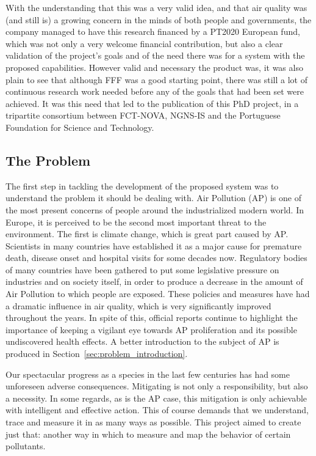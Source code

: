 With the understanding that this was a very valid idea, and that air
quality was (and still is) a growing concern in the minds of both people
and governments, the company managed to have this research financed by
a PT2020 European fund, which was not only a very welcome financial
contribution, but also a clear validation of the project's goals and of
the need there was for a system with the proposed capabilities. However
valid and necessary the product was, it was also plain to see that
although \gls{FFF} was a good starting point, there was still a lot of
continuous research work needed before any of the goals that had been
set were achieved. It was this need that led to the publication of this
PhD project, in a tripartite consortium between FCT-NOVA, NGNS-IS and
the Portuguese Foundation for Science and Technology.

\subsection{The Problem}%
\label{sub:the_problem}

The first step in tackling the development of the proposed system was to
understand the problem it should be dealing with. Air Pollution
(\gls{AP}) is one of the most present concerns of people around the
industrialized modern world. In Europe, it is perceived to be the second
most important threat to the environment. The first is climate change,
which is great part caused by \gls{AP}. Scientists in many countries
have established it as a major cause for premature death, disease onset
and hospital visits for some decades now. Regulatory bodies of many
countries have been gathered to put some legislative pressure on
industries and on society itself, in order to produce a decrease in the
amount of Air Pollution to which people are exposed. These policies and
measures have had a dramatic influence in air quality, which is very
significantly improved throughout the years. In spite of this, official
reports continue to highlight the importance of keeping a vigilant eye
towards \gls{AP} proliferation and its possible undiscovered health
effects. A better introduction to the subject of \gls{AP} is produced in
Section~\ref{sec:problem_introduction}.

Our spectacular progress as a species in the last few centuries has had
some unforeseen adverse consequences. Mitigating is not only a
responsibility, but also a necessity. In some regards, as is the
\gls{AP} case, this mitigation is only achievable with intelligent and
effective action. This of course demands that we understand, trace and
measure it in as many ways as possible. This project aimed to create
just that: another way in which to measure and map the behavior of
certain pollutants.


